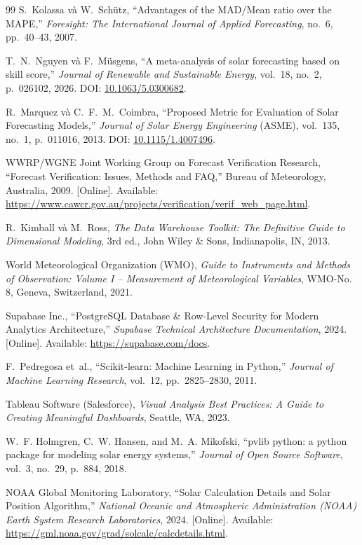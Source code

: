 \documentclass[12pt, a4paper]{report}
\begin{document}
\begin{thebibliography}{99}
S.~Kolassa và W.~Schütz,
\newblock ``Advantages of the MAD/Mean ratio over the MAPE,''
\newblock \textit{Foresight: The International Journal of Applied Forecasting}, no.~6, pp.~40--43, 2007.

T.~N.~Nguyen và F.~Müsgens,
\newblock ``A meta-analysis of solar forecasting based on skill score,''
\newblock \textit{Journal of Renewable and Sustainable Energy}, vol.~18, no.~2, p.~026102, 2026.
\newblock DOI: \href{https://doi.org/10.1063/5.0300682}{10.1063/5.0300682}.

R.~Marquez và C.~F.~M.~Coimbra,
\newblock ``Proposed Metric for Evaluation of Solar Forecasting Models,''
\newblock \textit{Journal of Solar Energy Engineering} (ASME), vol.~135, no.~1, p.~011016, 2013.
\newblock DOI: \href{https://doi.org/10.1115/1.4007496}{10.1115/1.4007496}.

WWRP/WGNE Joint Working Group on Forecast Verification Research,
\newblock ``Forecast Verification: Issues, Methods and FAQ,''
\newblock Bureau of Meteorology, Australia, 2009. [Online]. Available: \url{https://www.cawcr.gov.au/projects/verification/verif_web_page.html}.

R.~Kimball và M.~Ross,
\newblock \textit{The Data Warehouse Toolkit: The Definitive Guide to Dimensional Modeling}, 3rd ed.,
\newblock John Wiley \& Sons, Indianapolis, IN, 2013.

World Meteorological Organization (WMO),
\newblock \textit{Guide to Instruments and Methods of Observation: Volume I -- Measurement of Meteorological Variables},
\newblock WMO-No. 8, Geneva, Switzerland, 2021.

Supabase Inc.,
\newblock ``PostgreSQL Database \& Row-Level Security for Modern Analytics Architecture,''
\newblock \textit{Supabase Technical Architecture Documentation}, 2024. [Online]. Available: \url{https://supabase.com/docs}.

F.~Pedregosa et~al.,
\newblock ``Scikit-learn: Machine Learning in Python,''
\newblock \textit{Journal of Machine Learning Research}, vol.~12, pp.~2825--2830, 2011.

Tableau Software (Salesforce),
\newblock \textit{Visual Analysis Best Practices: A Guide to Creating Meaningful Dashboards},
\newblock Seattle, WA, 2023.

W.~F. Holmgren, C.~W. Hansen, and M.~A. Mikofski,
\newblock ``pvlib python: a python package for modeling solar energy systems,''
\newblock \textit{Journal of Open Source Software}, vol.~3, no.~29, p.~884, 2018.

NOAA Global Monitoring Laboratory,
\newblock ``Solar Calculation Details and Solar Position Algorithm,''
\newblock \textit{National Oceanic and Atmospheric Administration (NOAA) Earth System Research Laboratories}, 2024. [Online]. Available: \url{https://gml.noaa.gov/grad/solcalc/calcdetails.html}.

\end{thebibliography}
\end{document}
